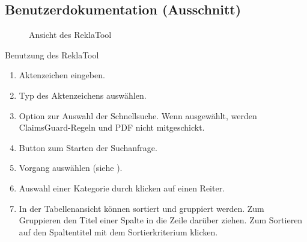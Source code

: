 \subsection{Benutzerdokumentation (Ausschnitt)}
\label{app:BenutzerDoku}
\begin{figure}[htb]
    \centering
    \caption{Ansicht des ReklaTool}
\end{figure}

Benutzung des ReklaTool
\begin{enumerate}
    \item Aktenzeichen eingeben.
    \item Typ des Aktenzeichens auswählen.
    \item Option zur Auswahl der Schnellsuche. Wenn ausgewählt, werden ClaimsGuard-Regeln und PDF nicht mitgeschickt.
    \item Button zum Starten der Suchanfrage.
    \item Vorgang auswählen (siehe ).
    \item Auswahl einer Kategorie durch klicken auf einen Reiter.
    \item In der Tabellenansicht können sortiert und gruppiert werden. Zum Gruppieren den Titel einer Spalte in die 
    Zeile darüber ziehen. Zum Sortieren auf den Spaltentitel mit dem Sortierkriterium klicken.
\end{enumerate}